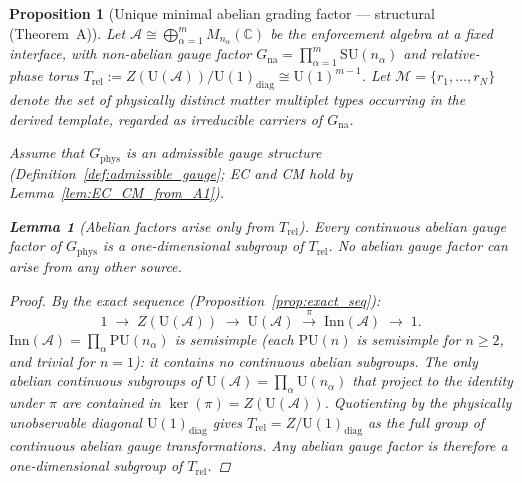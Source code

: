 \documentclass[11pt,a4paper]{article}
\newtheorem{lemma}[theorem]{Lemma}
\newtheorem{proposition}[theorem]{Proposition}
\theoremstyle{definition}
\newcommand{\SU}{\mathrm{SU}}
\begin{document}
\begin{proposition}[Unique minimal abelian grading factor ---
structural (Theorem~A)]\label{prop:unique_U1}
Let
$\mathcal{A} \cong \bigoplus_{\alpha=1}^{m} M_{n_\alpha}(\mathbb{C})$
be the enforcement algebra at a fixed interface, with non-abelian gauge
factor
$G_{\mathrm{na}} = \prod_{\alpha=1}^{m} \SU(n_\alpha)$
and relative-phase torus
$T_{\mathrm{rel}} := Z(\mathrm{U}(\mathcal{A})) / \mathrm{U}(1)_{\mathrm{diag}}
\cong \mathrm{U}(1)^{m-1}$.
Let $\mathcal{M} = \{r_1, \ldots, r_N\}$ denote the set of physically
distinct matter multiplet types occurring in the derived template,
regarded as irreducible carriers of $G_{\mathrm{na}}$.

Assume that $G_{\mathrm{phys}}$ is an admissible gauge structure
(Definition~\ref{def:admissible_gauge}; EC and CM hold by
Lemma~\ref{lem:EC_CM_from_A1}).

\begin{lemma}[Abelian factors arise only from $T_{\mathrm{rel}}$]
\label{lem:abelian_source}
Every continuous abelian gauge factor of $G_{\mathrm{phys}}$ is a
one-dimensional subgroup of $T_{\mathrm{rel}}$.  No abelian gauge
factor can arise from any other source.
\end{lemma}

\begin{proof}
By the exact sequence (Proposition~\ref{prop:exact_seq}):
\[
  1 \;\to\; Z(\mathrm{U}(\mathcal{A}))
  \;\to\; \mathrm{U}(\mathcal{A})
  \;\xrightarrow{\;\pi\;}\;
  \mathrm{Inn}(\mathcal{A}) \;\to\; 1.
\]
$\mathrm{Inn}(\mathcal{A}) = \prod_\alpha \mathrm{PU}(n_\alpha)$ is
semisimple (each $\mathrm{PU}(n)$ is semisimple for $n \ge 2$, and
trivial for $n = 1$): it contains no continuous abelian subgroups.
The only abelian continuous subgroups of $\mathrm{U}(\mathcal{A}) =
\prod_\alpha \mathrm{U}(n_\alpha)$ that project to the identity under
$\pi$ are contained in $\ker(\pi) = Z(\mathrm{U}(\mathcal{A}))$.
Quotienting by the physically unobservable diagonal
$\mathrm{U}(1)_{\mathrm{diag}}$ gives
$T_{\mathrm{rel}} = Z / \mathrm{U}(1)_{\mathrm{diag}}$ as the full
group of continuous abelian gauge transformations.  Any abelian gauge
factor is therefore a one-dimensional subgroup of $T_{\mathrm{rel}}$.


\end{proof}
\end{proposition}
\end{document}
